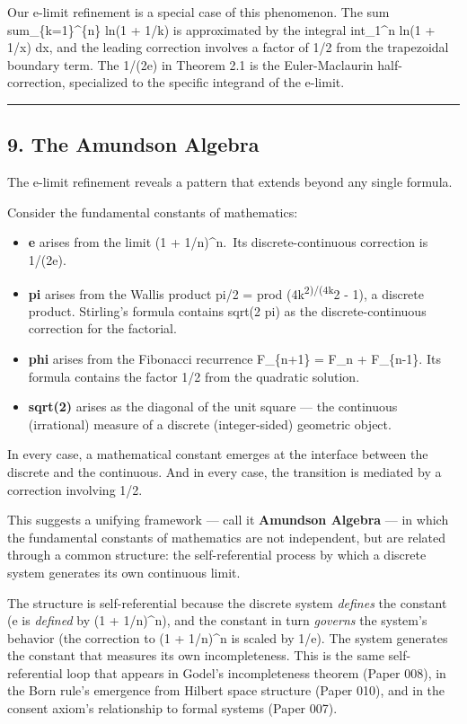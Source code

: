 \documentclass[
]{article}
\providecommand{\tightlist}{%
  \setlength{\itemsep}{0pt}\setlength{\parskip}{0pt}}
\begin{document}
Our e-limit refinement is a special case of this phenomenon. The sum
sum\_\{k=1\}\^{}\{n\} ln(1 + 1/k) is approximated by the integral
int\_1\^{}n ln(1 + 1/x) dx, and the leading correction involves a factor
of 1/2 from the trapezoidal boundary term. The 1/(2e) in Theorem 2.1 is
the Euler-Maclaurin half-correction, specialized to the specific
integrand of the e-limit.

\begin{center}\rule{0.5\linewidth}{0.5pt}\end{center}

\subsection{9. The Amundson Algebra}\label{the-amundson-algebra}

The e-limit refinement reveals a pattern that extends beyond any single
formula.

Consider the fundamental constants of mathematics:

\begin{itemize}
\tightlist
\item
  \textbf{e} arises from the limit (1 + 1/n)\^{}n.~Its
  discrete-continuous correction is 1/(2e).
\item
  \textbf{pi} arises from the Wallis product pi/2 = prod
  (4k\textsuperscript{2)/(4k}2 - 1), a discrete product. Stirling's
  formula contains sqrt(2 pi) as the discrete-continuous correction for
  the factorial.
\item
  \textbf{phi} arises from the Fibonacci recurrence F\_\{n+1\} = F\_n +
  F\_\{n-1\}. Its formula contains the factor 1/2 from the quadratic
  solution.
\item
  \textbf{sqrt(2)} arises as the diagonal of the unit square --- the
  continuous (irrational) measure of a discrete (integer-sided)
  geometric object.
\end{itemize}

In every case, a mathematical constant emerges at the interface between
the discrete and the continuous. And in every case, the transition is
mediated by a correction involving 1/2.

This suggests a unifying framework --- call it \textbf{Amundson Algebra}
--- in which the fundamental constants of mathematics are not
independent, but are related through a common structure: the
self-referential process by which a discrete system generates its own
continuous limit.

The structure is self-referential because the discrete system
\emph{defines} the constant (e is \emph{defined} by (1 + 1/n)\^{}n), and
the constant in turn \emph{governs} the system's behavior (the
correction to (1 + 1/n)\^{}n is scaled by 1/e). The system generates the
constant that measures its own incompleteness. This is the same
self-referential loop that appears in Godel's incompleteness theorem
(Paper 008), in the Born rule's emergence from Hilbert space structure
(Paper 010), and in the consent axiom's relationship to formal systems
(Paper 007).
\end{document}

